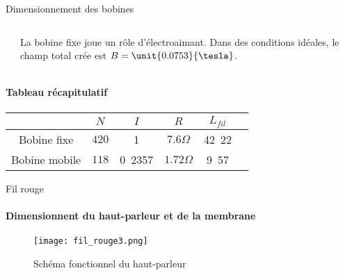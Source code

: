 \documentclass[pdf]{beamer}
\begin{document}
\begin{frame}{Dimensionnement des bobines}

	\begin{columns}
		\begin{column}{5cm}
		\end{column}

		\begin{column}{5cm}
			La bobine fixe joue un rôle d'électroaimant. Dans des conditions idéales, le champ total crée est $B = \unit{0.0753}{\tesla}$.
		\end{column}
	\end{columns}

	\bigbreak

	\paragraph{\textbf{Tableau récapitulatif}}
	\small
	{
		\begin{center}
		\begin{tabular}{c|c|c|c|c|c}
										& $N$ 	& $I$ 										& $R$ 							& $L_{fil}$ \\
			\hline
			Bobine fixe 	& $420$ & \unit{1}{\ampere} 			& $7.6\Omega$ 			& \unit{42.22}{\meter} \\
			\hline
			Bobine mobile & $118$ & \unit{0.2357}{\ampere}  & $1.72\Omega$ 	 		& \unit{9.57}{\meter} \\
		\end{tabular}
		\end{center}
	}
\end{frame}

\begin{frame}{Fil rouge}
\framesubtitle{Dimensionnent du haut-parleur et de la membrane}
\begin{figure}[ht!]
    \centering
    \texttt{[image: fil\_rouge3.png]}
    \caption{Schéma fonctionnel du haut-parleur}
    \label{schema_fonctionnel}
\end{figure}
\end{frame}
\end{document}

